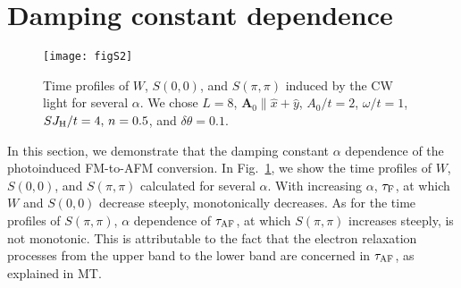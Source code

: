 \documentclass[aps,twocolumn,showpacs,prl,amsmath,amssymb]{revtex4-1}
\begin{document}
\section{Damping constant dependence}

\begin{figure}[b]\centering
\texttt{[image: figS2]}
\caption{Time profiles of $W$, $S(0, 0)$,  and $S(\pi, \pi)$ induced by the CW light for several $\alpha$. 
We chose $L=8$, $\bm{A}_0 \parallel \hat{x}+\hat{y}$, $A_0/t = 2$, $\omega/t = 1$, $SJ_{\rm H}/t = 4,\, n = 0.5$, and $\delta\theta = 0.1$.
}
\label{fig:S2}
\end{figure}

In this section, we demonstrate that the damping constant $\alpha$ dependence of the photoinduced FM-to-AFM conversion. 
%
In Fig.~\ref{fig:S2}, we show the time profiles of $W$, $S(0, 0)$, and $S(\pi, \pi)$ calculated for several $\alpha$.
With increasing $\alpha$, $\tau_{\rm F}$, at which $W$ and $S(0, 0)$ decrease steeply, monotonically decreases.
As for the time profiles of $S(\pi,\pi)$, $\alpha$ dependence of $\tau_{\rm AF}$, at which $S(\pi, \pi)$ increases steeply, is not monotonic. 
This is attributable to the fact that the electron relaxation processes from the upper band to the lower band are concerned in $\tau_{\rm AF}$, as explained in MT. 


%
\end{document}
